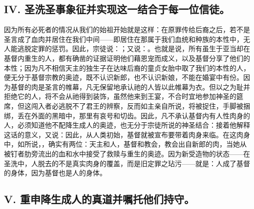 
\subsection{IV. 圣洗圣事象征并实现这一结合于每一位信徒。}

因为所有必死者的情况从我们的始祖开始就是这样：在原罪传给后裔之后，若不是圣言成了血肉并居住在我们中间——即居住在那属于我们血统和种族的本性中，无人能逃脱定罪的惩罚。因此，宗徒说：；又说：。也就是说，所有虽生于亚当却在基督内重生的人，都有确凿的证据证明他们藉恩宠而成义，以及基督分享了他们的本性；因为凡不相信天主的独生子在达味后裔的童贞女胎中取了我们的本性的人，便无分于基督宗教的奥迹，既不认识新郎，也不认识新娘，不能在婚宴中有份。因为基督的肉是圣言的帷幕，凡无保留地承认祂的人皆以此帷幕为衣。但以之为耻并拒绝它的人，将不会从祂得到装饰，虽然他来到王宴，不合时宜地参加神圣的筵席，但这闯入者必逃脱不了君王的辨察，反而如主亲自所说，将被捉住，手脚被捆绑，丢在外面的黑暗中，那里有哀号和切齿。因此，凡不承认基督内有人性肉身的人，必须知道他不配降生成人的奥迹，也无分于宗徒所说的神圣结合：接着他解释这话的意义，又说：因此，从人类初始，基督就被宣布要带着肉身来临。在这肉身中，如所说，，确实有两位：天主和人，基督和教会，教会出自新郎的肉，当她从被钉者肋旁流出的血和水中接受了救赎与重生的奥迹。因为新受造物的状态——在圣洗中，人脱去的不是真实肉身的覆盖，而是旧定罪之玷污——就是：人成了基督的身体，因为基督也是人的身体。\par


\subsection{V. 重申降生成人的真道并嘱托他们持守。}

